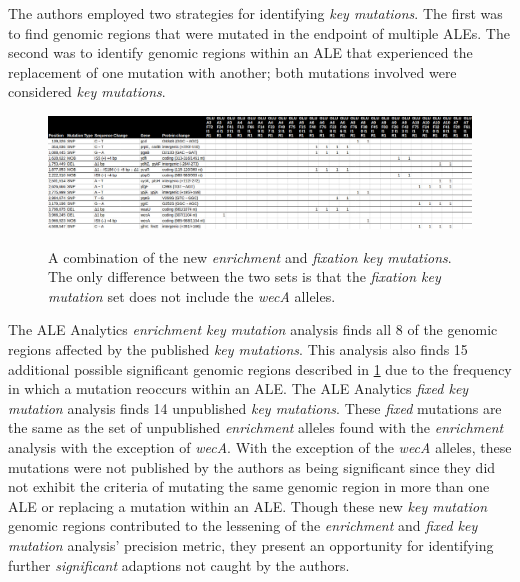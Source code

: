 \documentclass[12pt,final,masters,chapterheads]{ucsd}  %
\begin{document}
The authors employed two strategies for identifying \textit{key mutations}. The first was to find genomic regions that were mutated in the endpoint of multiple ALEs.
The second was to identify genomic regions within an ALE that experienced the replacement of one mutation with another; both mutations involved were considered \textit{key mutations}.
\begin{figure}[H]
  \caption{A combination of the new \textit{enrichment} and \textit{fixation key mutations}. The only difference between the two sets is that the \textit{fixation key mutation} set does not include the \textit{wecA} alleles.}
  \centering
  \includegraphics[width=\textwidth]{glu_new_enrich_fix_muts.png}
  \label{fig:glu_new_enrich_fix_muts}
\end{figure}
The ALE Analytics \textit{enrichment key mutation} analysis finds all 8 of the genomic regions affected by the published \textit{key mutations}. This analysis also finds 15 additional possible significant genomic regions described in \ref{fig:glu_new_enrich_fix_muts} due to the frequency in which a mutation reoccurs within an ALE. The ALE Analytics \textit{fixed key mutation} analysis finds 14 unpublished \textit{key mutations}. These \textit{fixed} mutations are the same as the set of unpublished \textit{enrichment} alleles found with the \textit{enrichment} analysis with the exception of \textit{wecA}. With the exception of the \textit{wecA} alleles, these mutations were not published by the authors as being significant since they did not exhibit the criteria of mutating the same genomic region in more than one ALE or replacing a mutation within an ALE. Though these new \textit{key mutation} genomic regions contributed to the lessening of the \textit{enrichment} and \textit{fixed key mutation} analysis' precision metric, they present an opportunity for identifying further \textit{significant} adaptions not caught by the authors.
\end{document}
